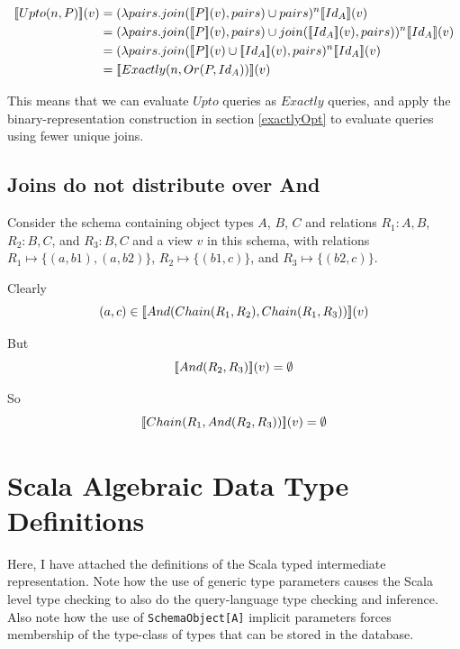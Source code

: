 \documentclass[12pt,a4paper,twoside,openright]{report}
\newcommand\codeName[1]{\texttt{#1}}
\newcommand{\db}[1]{{\bf [\![}#1{\bf ]\!]}}
\newcommand{\deno}[1]{\db{#1}(v)}
\newcommand{\denoRule}[2]{#1 \in \deno{#2}}
\begin{document}
\begin{equation}
\label{UptoToExactly}
\begin{split}
\deno{Upto(n, P)} & = (\lambda pairs. join(\deno{P}, pairs) \cup pairs)^n \deno{Id_A}\\
& = (\lambda pairs. join(\deno{P}, pairs) \cup join(\deno{Id_A}, pairs))^n \deno{Id_A}\\
				  & = (\lambda pairs. join(\deno{P} \cup \deno{Id_A}, pairs)^n \deno{Id_A}\\
				  & = \deno{Exactly(n, Or(P, Id_A))}
\end{split}
\end{equation}

This means that we can evaluate $Upto$ queries as $Exactly$ queries, and apply the binary-representation construction in section \ref{exactlyOpt} to evaluate queries using fewer unique joins.


\section{Joins do not distribute over And}

Consider the schema containing object types $A$, $B$, $C$ and relations $R_1 \colon A,B$, $R_2 \colon B,C$,  and $R_3 \colon B,C$ and a view $v$ in this schema, with relations $R_1 \mapsto \lbrace(a, b1), (a, b2)\rbrace$, $R_2 \mapsto \lbrace(b1, c)\rbrace$, and $R_3 \mapsto \lbrace(b2, c)\rbrace$.

Clearly 
\begin{equation}
\denoRule{(a,c)}{And(Chain(R_1, R_2), Chain(R_1, R_3))}
\end{equation}

But 
\begin{equation}
 \deno{And(R_2, R_3)} = \emptyset
\end{equation}

So
\begin{equation}
 \deno{Chain(R_1, And(R_2, R_3))} = \emptyset
\end{equation}
 
\chapter{Scala Algebraic Data Type Definitions}\label{ScalaADT}
Here, I have attached the definitions of the Scala typed intermediate representation. Note how the use of generic type parameters causes the Scala level type checking to also do the query-language type checking and inference. Also note how the use of \codeName{SchemaObject[A]} implicit parameters forces membership of the type-class of types that can be stored in the database.
\end{document}
